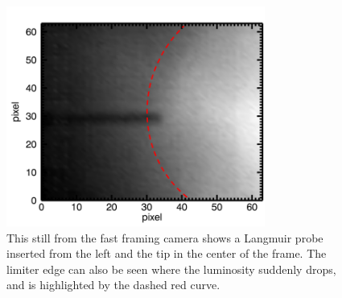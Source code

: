 \documentclass[%
 reprint,
 amsmath,amssymb,
 aps,
]{revtex4-1}
\begin{document}
\begin{figure}[!htbp]
\centerline{}
\includegraphics[width=8.5cm]{plot_movie_still}
\caption{\label{fig:plot_movie_still} This still from the fast framing camera shows a Langmuir probe inserted from the left and the tip in the center of the frame. The limiter edge can also be seen where the luminosity suddenly drops, and is highlighted by the dashed red curve.}
\end{figure}
\end{document}
